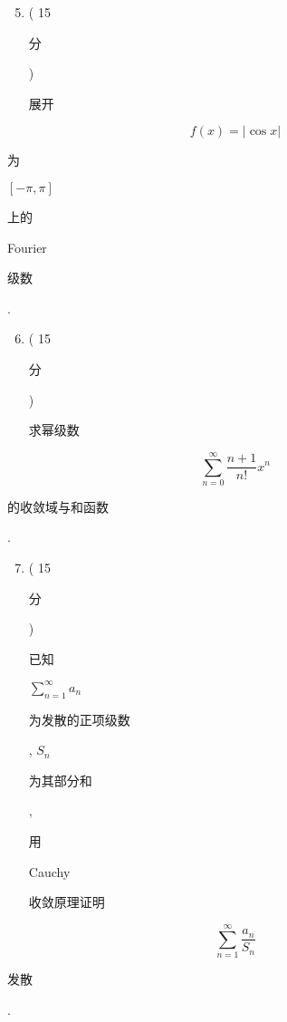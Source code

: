 \documentclass[10pt]{article}
\begin{document}
\begin{enumerate}
  \setcounter{enumi}{4}
  \item ( 15 \begin{CJK}{UTF8}{mj}分\end{CJK}) \begin{CJK}{UTF8}{mj}展开\end{CJK}
\end{enumerate}
$$
f(x)=|\cos x|
$$
\begin{CJK}{UTF8}{mj}为\end{CJK} $[-\pi, \pi]$ \begin{CJK}{UTF8}{mj}上的\end{CJK} Fourier \begin{CJK}{UTF8}{mj}级数\end{CJK}.

\begin{enumerate}
  \setcounter{enumi}{5}
  \item ( 15 \begin{CJK}{UTF8}{mj}分\end{CJK}) \begin{CJK}{UTF8}{mj}求幂级数\end{CJK}
\end{enumerate}
$$
\sum_{n=0}^{\infty} \frac{n+1}{n !} x^{n}
$$
\begin{CJK}{UTF8}{mj}的收敛域与和函数\end{CJK}.

\begin{enumerate}
  \setcounter{enumi}{6}
  \item ( 15 \begin{CJK}{UTF8}{mj}分\end{CJK}) \begin{CJK}{UTF8}{mj}已知\end{CJK} $\sum_{n=1}^{\infty} a_{n}$ \begin{CJK}{UTF8}{mj}为发散的正项级数\end{CJK}, $S_{n}$ \begin{CJK}{UTF8}{mj}为其部分和\end{CJK}, \begin{CJK}{UTF8}{mj}用\end{CJK} Cauchy \begin{CJK}{UTF8}{mj}收敛原理证明\end{CJK}
\end{enumerate}
$$
\sum_{n=1}^{\infty} \frac{a_{n}}{S_{n}}
$$
\begin{CJK}{UTF8}{mj}发散\end{CJK}.
\end{document}
